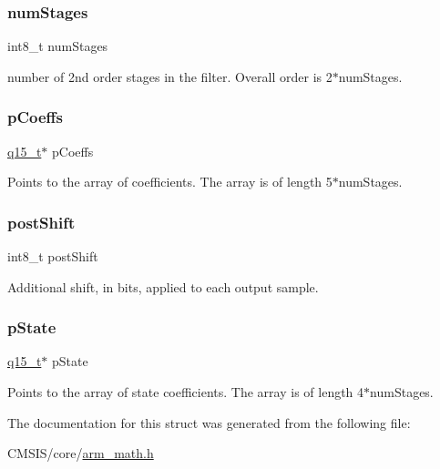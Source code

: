 \subsubsection{\texorpdfstring{numStages}{numStages}}
{\footnotesize\ttfamily int8\+\_\+t num\+Stages}

number of 2nd order stages in the filter. Overall order is 2$\ast$num\+Stages. \mbox{\label{structarm__biquad__casd__df1__inst__q15_a7ca181a37f714d174445f486bebce26f}} 
\subsubsection{\texorpdfstring{pCoeffs}{pCoeffs}}
{\footnotesize\ttfamily \mbox{\hyperlink{arm__math_8h_ab5a8fb21a5b3b983d5f54f31614052ea}{q15\+\_\+t}}$\ast$ p\+Coeffs}

Points to the array of coefficients. The array is of length 5$\ast$num\+Stages. \mbox{\label{structarm__biquad__casd__df1__inst__q15_a3603cbf084938b6931bcb05dfe487f09}} 
\subsubsection{\texorpdfstring{postShift}{postShift}}
{\footnotesize\ttfamily int8\+\_\+t post\+Shift}

Additional shift, in bits, applied to each output sample. \mbox{\label{structarm__biquad__casd__df1__inst__q15_ae29dfdb736374fcddaeaec4b7770170c}} 
\subsubsection{\texorpdfstring{pState}{pState}}
{\footnotesize\ttfamily \mbox{\hyperlink{arm__math_8h_ab5a8fb21a5b3b983d5f54f31614052ea}{q15\+\_\+t}}$\ast$ p\+State}

Points to the array of state coefficients. The array is of length 4$\ast$num\+Stages. 

The documentation for this struct was generated from the following file\+:\begin{DoxyCompactItemize}
\item 
C\+M\+S\+I\+S/core/\mbox{\hyperlink{arm__math_8h}{arm\+\_\+math.\+h}}\end{DoxyCompactItemize}

